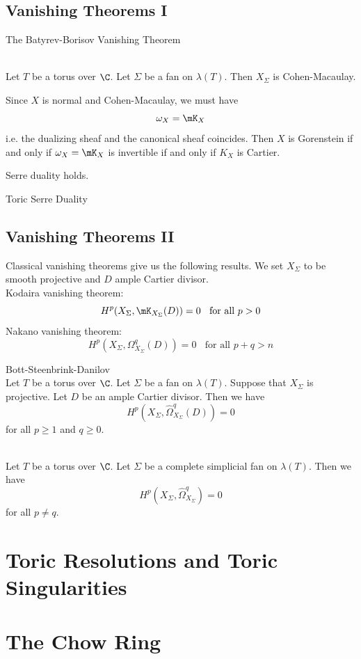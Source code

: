 \documentclass[a4paper]{article}
\begin{document}
\subsection{Vanishing Theorems I}
\begin{thm}{The Batyrev-Borisov Vanishing Theorem}{}\\
\end{thm}

\begin{prp}{}{}\\
Let $T$ be a torus over $\C$. Let $\Sigma$ be a fan on $\lambda(T)$. Then $X_\Sigma$ is Cohen-Macaulay. 
\end{prp}

Since $X$ is normal and Cohen-Macaulay, we must have $$\omega_X=\mK_X$$ i.e. the dualizing sheaf and the canonical sheaf coincides. Then $X$ is Gorenstein if and only if $\omega_X=\mK_X$ is invertible if and only if $K_X$ is Cartier. 

Serre duality holds. 

\begin{thm}{Toric Serre Duality}{}
\end{thm}

\subsection{Vanishing Theorems II}
Classical vanishing theorems give us the following results. We set $X_\Sigma$ to be smooth projective and $D$ ample Cartier divisor. \\

Kodaira vanishing theorem: $$H^p(X_\Sigma,\mK_{X_\Sigma}(D))=0\;\;\text{ for all }p>0$$
Nakano vanishing theorem: $$H^p(X_\Sigma,\Omega_{X_\Sigma}^q(D))=0\;\;\text{ for all }p+q>n$$

\begin{thm}{Bott-Steenbrink-Danilov}{}\\
Let $T$ be a torus over $\C$. Let $\Sigma$ be a fan on $\lambda(T)$. Suppose that $X_\Sigma$ is projective. Let $D$ be an ample Cartier divisor. Then we have $$H^p(X_\Sigma,\widehat{\Omega}_{X_\Sigma}^q(D))=0$$ for all $p\geq 1$ and $q\geq 0$. 
\end{thm}

\begin{prp}{}{}\\
Let $T$ be a torus over $\C$. Let $\Sigma$ be a complete simplicial fan on $\lambda(T)$. Then we have $$H^p(X_\Sigma,\widehat{\Omega}_{X_\Sigma}^q)=0$$ for all $p\neq q$. 
\end{prp}

\pagebreak
\section{Toric Resolutions and Toric Singularities}

\pagebreak
\section{The Chow Ring}
\end{document}
